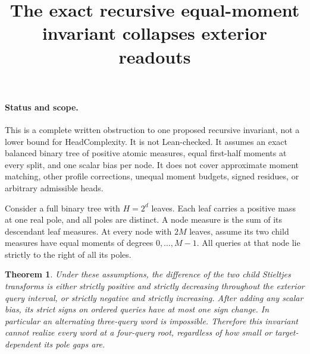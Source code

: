 \documentclass[11pt]{article}
\title{The exact recursive equal-moment invariant collapses exterior readouts}
\author{}\date{}
\newtheorem{theorem}{Theorem}
\begin{document}
\maketitle
\paragraph{Status and scope.}
This is a complete written obstruction to one proposed recursive invariant,
not a lower bound for HeadComplexity. It is not Lean-checked. It assumes an
exact balanced binary tree of positive atomic measures, equal first-half
moments at every split, and one scalar bias per node. It does not cover
approximate moment matching, other profile corrections, unequal moment
budgets, signed residues, or arbitrary admissible heads.

Consider a full binary tree with $H=2^d$ leaves. Each leaf carries a
positive mass at one real pole, and all poles are distinct. A node measure
is the sum of its descendant leaf measures. At every node with $2M$ leaves,
assume its two child measures have equal moments of degrees $0,\ldots,M-1$.
All queries at that node lie strictly to the right of all its poles.

\begin{theorem}
Under these assumptions, the difference of the two child Stieltjes
transforms is either strictly positive and strictly decreasing throughout
the exterior query interval, or strictly negative and strictly increasing.
After adding any scalar bias, its strict signs on ordered queries have at
most one sign change. In particular an alternating three-query word is
impossible. Therefore this invariant cannot realize every word at a
four-query root, regardless of how small or target-dependent its pole gaps are.
\end{theorem}
\end{document}
